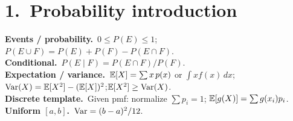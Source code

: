 \section*{1.\ Probability introduction}
\textbf{Events / probability.}\ $0\le P(E)\le1$;\quad $P(E\cup F)=P(E)+P(F)-P(E\cap F)$.\\
\textbf{Conditional.}\ $P(E\mid F)=P(E\cap F)/P(F)$.\\
\textbf{Expectation / variance.}\ $\mathbb{E}[X]=\sum x\,p(x)$ or $\int x f(x)\,dx$;\quad $\mathrm{Var}(X)=\mathbb{E}[X^2]-(\mathbb{E}[X])^2$;\quad $\mathbb{E}[X^2]\ge\mathrm{Var}(X)$.\\
\textbf{Discrete template.}\ Given pmf: normalize $\sum p_i=1$; $\mathbb{E}[g(X)]=\sum g(x_i)p_i$.\\
\textbf{Uniform $[a,b]$.}\ $\mathrm{Var}=(b-a)^2/12$.
